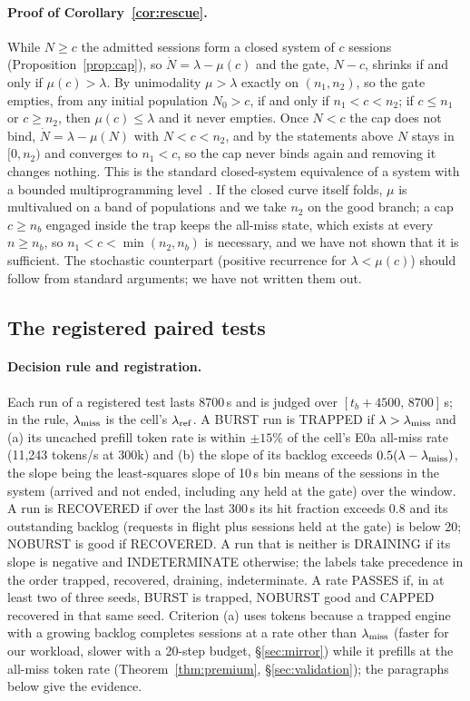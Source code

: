 \paragraph{Proof of Corollary~\ref{cor:rescue}.} While $N\ge c$ the admitted sessions form a closed system of $c$ sessions (Proposition~\ref{prop:cap}), so $\dot N=\lambda-\mu(c)$ and the gate, $N-c$, shrinks if and only if $\mu(c)>\lambda$. By unimodality $\mu>\lambda$ exactly on $(n_1,n_2)$, so the gate empties, from any initial population $N_0>c$, if and only if $n_1<c<n_2$; if $c\le n_1$ or $c\ge n_2$, then $\mu(c)\le\lambda$ and it never empties. Once $N<c$ the cap does not bind, $\dot N=\lambda-\mu(N)$ with $N<c<n_2$, and by the statements above $N$ stays in $[0,n_2)$ and converges to $n_1<c$, so the cap never binds again and removing it changes nothing. This is the standard closed-system equivalence of a system with a bounded multiprogramming level~\citep{denning1976optimal}. If the closed curve itself folds, $\mu$ is multivalued on a band of populations and we take $n_2$ on the good branch; a cap $c\ge n_b$ engaged inside the trap keeps the all-miss state, which exists at every $n\ge n_b$, so $n_1<c<\min(n_2,n_b)$ is necessary, and we have not shown that it is sufficient. The stochastic counterpart (positive recurrence for $\lambda<\mu(c)$) should follow from standard arguments; we have not written them out.

\subsection{The registered paired tests}\label{app:e2tests}

\paragraph{Decision rule and registration.}\label{sec:prereg}
Each run of a registered test lasts 8700\,s and is judged over $[t_b+4500,\,8700]$\,s; in the rule, $\lambda_{\mathrm{miss}}$ is the cell's $\lambda_{\mathrm{ref}}$. A BURST run is TRAPPED if $\lambda>\lambda_{\mathrm{miss}}$ and (a) its uncached prefill token rate is within $\pm15\%$ of the cell's E0a all-miss rate (11,243 tokens/s at 300k) and (b) the slope of its backlog exceeds $0.5(\lambda-\lambda_{\mathrm{miss}})$, the slope being the least-squares slope of 10\,s bin means of the sessions in the system (arrived and not ended, including any held at the gate) over the window. A run is RECOVERED if over the last 300\,s its hit fraction exceeds 0.8 and its outstanding backlog (requests in flight plus sessions held at the gate) is below 20; NOBURST is good if RECOVERED. A run that is neither is DRAINING if its slope is negative and INDETERMINATE otherwise; the labels take precedence in the order trapped, recovered, draining, indeterminate. A rate PASSES if, in at least two of three seeds, BURST is trapped, NOBURST good and CAPPED recovered in that same seed. Criterion (a) uses tokens because a trapped engine with a growing backlog completes sessions at a rate other than $\lambda_{\mathrm{miss}}$ (faster for our workload, slower with a 20-step budget, \S\ref{sec:mirror}) while it prefills at the all-miss token rate (Theorem~\ref{thm:premium}, \S\ref{sec:validation}); the paragraphs below give the evidence.

